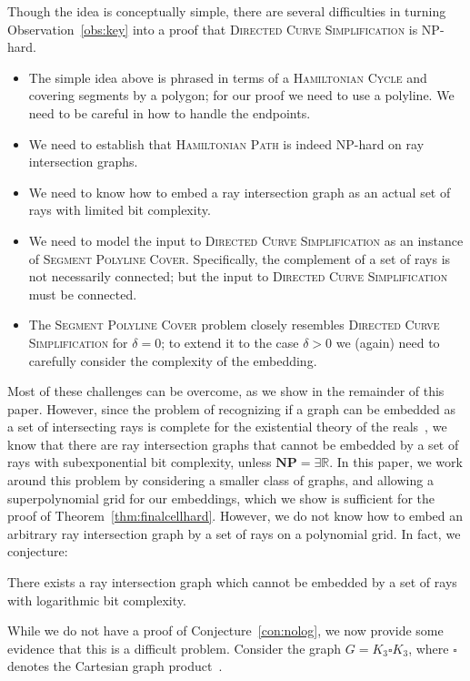 \documentclass[]{llncs}
\newcommand{\hamcycle}{\textsc{Hamiltonian Cycle}\xspace}
\newcommand{\hampath}{\textsc{Hamiltonian Path}\xspace}
\newcommand{\curvesimp}{\textsc{Directed Curve Simplification}\xspace}
\newcommand{\segcover}{\textsc{Segment Polyline Cover}\xspace}
\begin{document}
Though the idea is conceptually simple,
there are several difficulties in turning Observation~\ref {obs:key} into a proof that \curvesimp is NP-hard.
\begin {itemize}
  \item The simple idea above is phrased in terms of a \hamcycle and covering segments by a polygon; for our proof we need to use a polyline. We need to be careful in how to handle the endpoints.
  \item We need to establish that \hampath is indeed NP-hard on ray intersection graphs.
  \item We need to know how to embed a ray intersection graph as an actual set of rays with limited bit complexity.
  \item We need to model the input to \curvesimp as an instance of \segcover. Specifically, the complement of a set of rays is not necessarily connected; but the input to \curvesimp must be connected.
  \item The \segcover problem closely resembles \curvesimp for $\delta = 0$; to extend it to the case $\delta > 0$ we (again) need to carefully consider the complexity of the embedding.
\end {itemize}
%
Most of these challenges can be overcome, as we show in the remainder of this paper. 
However, since the problem of recognizing if a graph can be embedded as a set of intersecting rays is complete for the existential theory of the reals~\cite {JGAA-470}, we know that there are ray intersection graphs that cannot be embedded by a set of rays with subexponential bit complexity, unless $\textbf{NP} = \exists\mathbb{R}$.
In this paper, we work around  this problem by considering a smaller class of graphs, and allowing a superpolynomial grid for our embeddings, which we show is sufficient for the proof of Theorem~\ref {thm:finalcellhard}.
\iffalse
However, we do not know how to embed an arbitrary ray intersection graph by a set of rays on a polynomial grid. In fact, we conjecture:

\begin {conjecture} \label {con:nolog}
  There exists a ray intersection graph which cannot be embedded by a set of rays with logarithmic bit complexity.
\end {conjecture}
%
While we do not have a proof of Conjecture~\ref {con:nolog}, we now provide some evidence that this is a difficult problem.
Consider the graph $G = K_3 \square K_3$, where $\square$ denotes the Cartesian graph product~\cite {harary69}.
\end{document}
